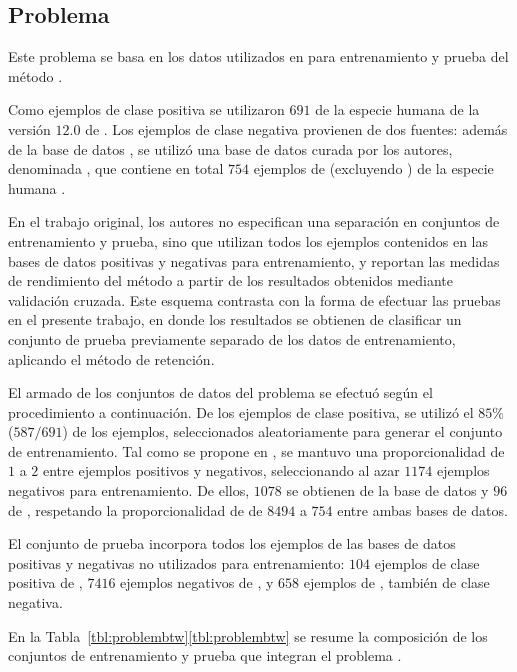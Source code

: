 %
%
\subsection{Problema \micropred{}}
%
Este problema se basa en los datos utilizados en \cite{batuwita} para
entrenamiento y prueba del método \work{\micropred}.

Como ejemplos de clase positiva se utilizaron $691$ 
de la especie humana de la versión $12$.$0$ de
\dset{\mirbase}.
Los ejemplos de clase negativa provienen de dos fuentes: además de la
base de datos , se utilizó una base de datos curada por
los autores, denominada , que contiene en
total $754$ ejemplos de  (excluyendo ) de la
especie humana \cite{batuwita}.

En el trabajo original, los autores no especifican una separación
en conjuntos de entrenamiento y prueba, sino que utilizan todos los
ejemplos contenidos en las bases de datos positivas y negativas para
entrenamiento, y reportan las medidas de rendimiento del método
a partir de los resultados obtenidos mediante validación cruzada.
Este esquema contrasta con la forma de efectuar las pruebas en el
presente trabajo, en donde los resultados se obtienen de clasificar un
conjunto de prueba previamente separado de los datos de entrenamiento,
aplicando el método de retención.

El armado de los conjuntos de datos del problema \prob\micropred{} se
efectuó según el procedimiento a continuación.
De los ejemplos de clase positiva, se utilizó el $85\%$ ($587/691$) de
los ejemplos, seleccionados aleatoriamente para generar el conjunto de
entrenamiento.
Tal como se propone en \cite{ng}, se mantuvo una proporcionalidad de
$1$ a $2$ entre ejemplos positivos y negativos, seleccionando al azar
$1174$ ejemplos negativos para entrenamiento.
De ellos, $1078$ se obtienen de la base de datos  y $96$
de , respetando la proporcionalidad de
de $8494$ a $754$ entre ambas bases de datos.

El conjunto de prueba incorpora todos los ejemplos de las bases de
datos positivas y negativas no utilizados para entrenamiento: $104$
ejemplos de clase positiva de , $7416$ ejemplos
negativos de , y $658$ ejemplos de , también de clase negativa.

En la \iflatexml{}Tabla~\ref{tbl:problembtw}\else\autoref{tbl:problembtw}\fi{}
se resume la composición de los conjuntos de entrenamiento y prueba
que integran el problema \prob\micropred{}.
